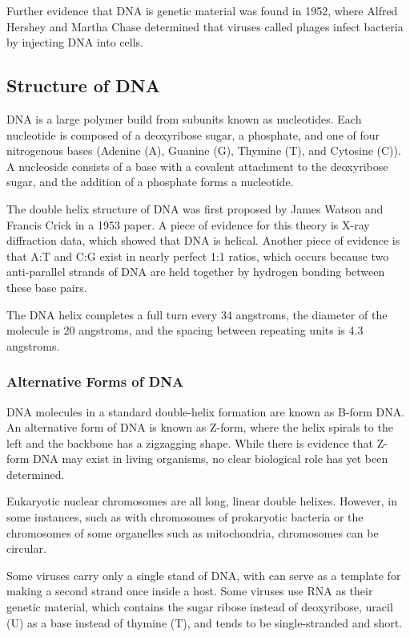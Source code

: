 \documentclass[12pt,titlepage]{article}
\begin{document}
        Further evidence that DNA is genetic material was found in 1952, where Alfred Hershey and Martha Chase determined that viruses called phages infect bacteria
        by injecting DNA into cells.

      \subsection{Structure of DNA}
        DNA is a large polymer build from subunits known as nucleotides. Each nucleotide is composed of a deoxyribose sugar, a phosphate, and one of four nitrogenous
        bases (Adenine (A), Guanine (G), Thymine (T), and Cytosine (C)). A nucleoside consists of a base with a covalent attachment to the deoxyribose sugar, and the
        addition of a phosphate forms a nucleotide.

        The double helix structure of DNA was first proposed by James Watson and Francis Crick in a 1953 paper. A piece of evidence for this theory is X-ray diffraction
        data, which showed that DNA is helical. Another piece of evidence is that A:T and C:G exist in nearly perfect 1:1 ratios, which occurs because two anti-parallel
        strands of DNA are held together by hydrogen bonding between these base pairs.

        The DNA helix completes a full turn every 34 angstroms, the diameter of the molecule is 20 angstroms, and the spacing between repeating units is 4.3 angstroms.

        \subsubsection{Alternative Forms of DNA}
          DNA molecules in a standard double-helix formation are known as B-form DNA. An alternative form of DNA is known as Z-form, where the helix spirals to the left
          and the backbone has a zigzagging shape. While there is evidence that Z-form DNA may exist in living organisms, no clear biological role has yet been determined.

          Eukaryotic nuclear chromosomes are all long, linear double helixes. However, in some instances, such as with chromosomes of prokaryotic bacteria or the chromosomes
          of some organelles such as mitochondria, chromosomes can be circular.

          Some viruses carry only a single stand of DNA, with can serve as a template for making a second strand once inside a host. Some viruses use RNA as their genetic
          material, which contains the sugar ribose instead of deoxyribose, uracil (U) as a base instead of thymine (T), and tends to be single-stranded and short.
\end{document}
